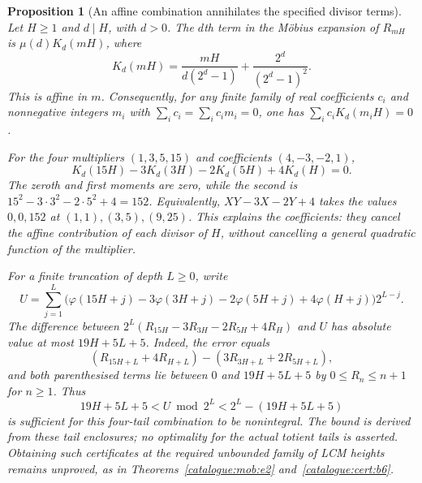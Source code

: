 \documentclass[11pt]{article}
\theoremstyle{plain}
\newtheorem{prop}[thm]{Proposition}
\theoremstyle{definition}
\theoremstyle{remark}
\begin{document}
\begin{prop}[An affine combination annihilates the specified divisor terms]\label{catalogue:mob:e3}
Let $H\ge1$ and $d\mid H$, with $d>0$. The $d$th term in the
M\"obius expansion of $R_{mH}$ is $\mu(d)K_d(mH)$, where
\[
 K_d(mH)=\frac{mH}{d(2^d-1)}+\frac{2^d}{(2^d-1)^2}.
\]
This is affine in $m$. Consequently, for any finite family of real
coefficients $c_i$ and nonnegative integers $m_i$ with
$\sum_i c_i=\sum_i c_i m_i=0$, one has
$\sum_i c_i K_d(m_iH)=0$.

For the four multipliers $(1,3,5,15)$ and coefficients $(4,-3,-2,1)$,
\[
 K_d(15H)-3K_d(3H)-2K_d(5H)+4K_d(H)=0.
\]
The zeroth and first moments are zero, while the second is
$15^2-3\cdot3^2-2\cdot5^2+4=152$.
Equivalently, $XY-3X-2Y+4$ takes the values $0,0,152$ at
$(1,1),(3,5),(9,25)$. This explains the coefficients: they cancel the
affine contribution of each divisor of $H$, without cancelling a general
quadratic function of the multiplier.

For a finite truncation of depth $L\ge0$, write
\[
 U=\sum_{j=1}^{L}
 \bigl(\varphi(15H+j)-3\varphi(3H+j)
       -2\varphi(5H+j)+4\varphi(H+j)\bigr)2^{L-j}.
\]
The difference between $2^L(R_{15H}-3R_{3H}-2R_{5H}+4R_H)$ and $U$
has absolute value at most $19H+5L+5$. Indeed, the error equals
\[
 (R_{15H+L}+4R_{H+L})-(3R_{3H+L}+2R_{5H+L}),
\]
and both parenthesised terms lie between $0$ and $19H+5L+5$ by
$0\le R_n\le n+1$ for $n\ge1$.
Thus
\[
 19H+5L+5<U\bmod2^L<2^L-(19H+5L+5)
\]
is sufficient for this four-tail combination to be nonintegral.
The bound is derived from these tail enclosures; no optimality for the
actual totient tails is asserted. Obtaining such certificates at the
required unbounded family of LCM heights remains unproved, as in
Theorems~\ref{catalogue:mob:e2} and~\ref{catalogue:cert:b6}.
\end{prop}
\end{document}

